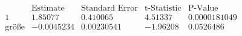 \[\begin{array}{l|llll}
 \text{} & \text{Estimate} & \text{Standard Error} & \text{t-Statistic} & \text{P-Value} \\
\hline
 1 & 1.85077 & 0.410065 & 4.51337 & 0.0000181049 \\
 \text{gr{\" o}{\ss}e} & -0.0045234 & 0.00230541 & -1.96208 & 0.0526486 \\
\end{array}\]

